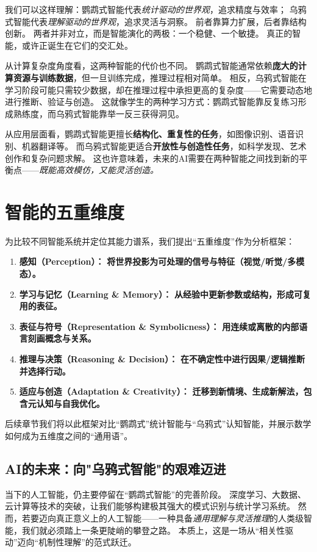 我们可以这样理解：鹦鹉式智能代表\emph{统计驱动的世界观}，追求精度与效率；
乌鸦式智能代表\emph{理解驱动的世界观}，追求灵活与洞察。
前者靠算力扩展，后者靠结构创新。
两者并非对立，而是智能演化的两极：一个稳健、一个敏捷。
真正的智能，或许正诞生在它们的交汇处。

从计算复杂度角度看，这两种智能的代价也不同。
鹦鹉式智能通常依赖\textbf{庞大的计算资源与训练数据}，但一旦训练完成，推理过程相对简单。
相反，乌鸦式智能在学习阶段可能只需较少数据，却在推理过程中承担更高的复杂度——它需要动态地进行推断、验证与创造。
这就像学生的两种学习方式：鹦鹉式智能靠反复练习形成熟练度，而乌鸦式智能靠举一反三获得洞见。

从应用层面看，鹦鹉式智能更擅长\textbf{结构化、重复性的任务}，如图像识别、语音识别、机器翻译等。
而乌鸦式智能更适合\textbf{开放性与创造性任务}，如科学发现、艺术创作和复杂问题求解。
这也许意味着，未来的AI需要在两种智能之间找到新的平衡点——\emph{既能高效模仿，又能灵活创造。}

\section{智能的五重维度}\label{sec:five-dimensions}

为比较不同智能系统并定位其能力谱系，我们提出“五重维度”作为分析框架：
\begin{enumerate}
  \item \textbf{感知（Perception）：} \textbf{将世界投影为可处理的信号与特征（视觉/听觉/多模态）。}
  \item \textbf{学习与记忆（Learning \& Memory）：} \textbf{从经验中更新参数或结构，形成可复用的表征。}
  \item \textbf{表征与符号（Representation \& Symbolicness）：} \textbf{用连续或离散的内部语言刻画概念与关系。}
  \item \textbf{推理与决策（Reasoning \& Decision）：} \textbf{在不确定性中进行因果/逻辑推断并选择行动。}
  \item \textbf{适应与创造（Adaptation \& Creativity）：} \textbf{迁移到新情境、生成新解法，包含元认知与自我优化。}
\end{enumerate}

后续章节我们将以此框架对比“鹦鹉式”统计智能与“乌鸦式”认知智能，并展示数学如何成为五维度之间的“通用语”。

\subsection{AI的未来：向"乌鸦式智能"的艰难迈进}

当下的人工智能，仍主要停留在“鹦鹉式智能”的完善阶段。
深度学习、大数据、云计算等技术的突破，让我们能够构建极其强大的模式识别与统计学习系统。
然而，若要迈向真正意义上的人工智能——一种具备\emph{通用理解与灵活推理}的人类级智能，我们就必须踏上一条更陡峭的攀登之路。
本质上，这是一场从“相关性驱动”迈向“机制性理解”的范式跃迁。

